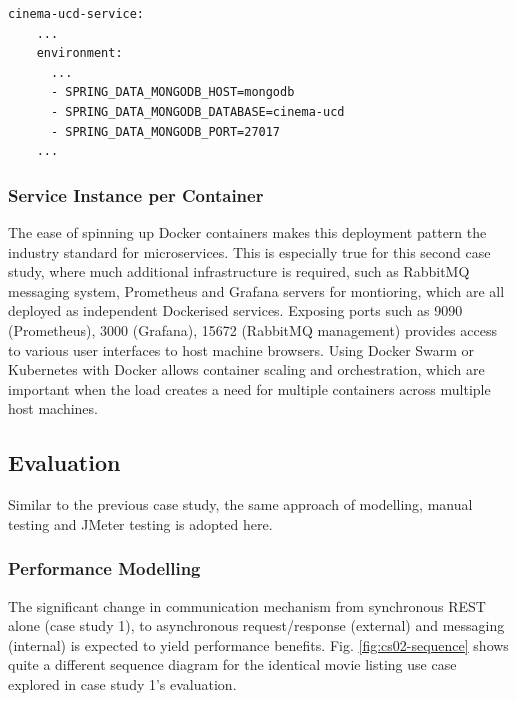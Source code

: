 \begin{lstlisting}[caption=Snippet from \code{docker-compose.yml} for UCD cinema]
  cinema-ucd-service:
    ...
    environment:
      ...
      - SPRING_DATA_MONGODB_HOST=mongodb
      - SPRING_DATA_MONGODB_DATABASE=cinema-ucd
      - SPRING_DATA_MONGODB_PORT=27017
    ...
\end{lstlisting}

\subsubsection{Service Instance per Container}

The ease of spinning up Docker containers makes this deployment pattern the industry standard for microservices. This is especially true for this second case study, where much additional infrastructure is required, such as RabbitMQ messaging system, Prometheus and Grafana servers for montioring, which are all deployed as independent Dockerised services. Exposing ports such as 9090 (Prometheus), 3000 (Grafana), 15672 (RabbitMQ management) provides access to various user interfaces to host machine browsers. Using Docker Swarm or Kubernetes with Docker allows container scaling and orchestration, which are important when the load creates a need for multiple containers across multiple host machines.

\subsection{Evaluation}

Similar to the previous case study, the same approach of modelling, manual testing and JMeter testing is adopted here.

\subsubsection{Performance Modelling}

The significant change in communication mechanism from synchronous REST alone (case study 1), to asynchronous request/response (external) and messaging (internal) is expected to yield performance benefits. Fig. \ref{fig:cs02-sequence} shows quite a different sequence diagram for the identical movie listing use case explored in case study 1's evaluation.

